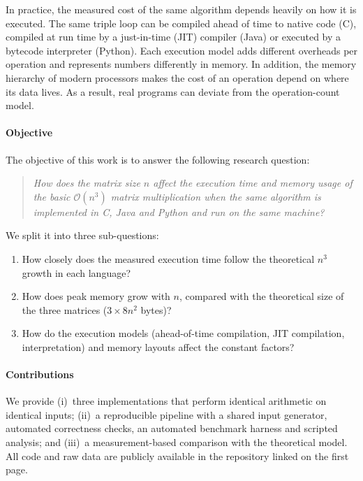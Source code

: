 \documentclass[conference,a4paper]{IEEEtran}
\newcommand{\bigO}[1]{\mathcal{O}\!\left(#1\right)}
\begin{document}
In practice, the measured cost of the same algorithm depends heavily on how it
is executed. The same triple loop can be compiled ahead of time to native code
(C), compiled at run time by a just-in-time (JIT) compiler (Java) or executed by
a bytecode interpreter (Python). Each execution model adds different overheads
per operation and represents numbers differently in memory. In addition, the
memory hierarchy of modern processors makes the cost of an operation depend on
where its data lives. As a result, real programs can deviate from the
operation-count model.

\paragraph{Objective} The objective of this work is to answer the following
research question:

\begin{quote}
\emph{How does the matrix size $n$ affect the execution time and memory usage of
the basic $\bigO{n^3}$ matrix multiplication when the same algorithm is
implemented in C, Java and Python and run on the same machine?}
\end{quote}

\noindent We split it into three sub-questions:
\begin{enumerate}[label=\textbf{RQ\arabic*.}, leftmargin=3.2em, itemsep=1pt]
  \item How closely does the measured execution time follow the theoretical
        $n^3$ growth in each language?
  \item How does peak memory grow with $n$, compared with the theoretical
        size of the three matrices ($3 \times 8n^2$ bytes)?
  \item How do the execution models (ahead-of-time compilation, JIT compilation,
        interpretation) and memory layouts affect the constant factors?
\end{enumerate}

\paragraph{Contributions} We provide (i)~three implementations that perform
identical arithmetic on identical inputs; (ii)~a reproducible pipeline with a
shared input generator, automated correctness checks, an automated benchmark
harness and scripted analysis; and (iii)~a measurement-based comparison with the
theoretical model. All code and raw data are publicly available in the
repository linked on the first page.
\end{document}
